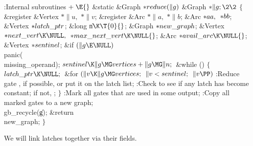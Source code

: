 \Y\B\4:Internal subroutines\X${}\mathrel+\E{}$\6
\1\1\&{static} \&{Graph} ${}{*}\\{reduce}(\|g){}$\6
\&{Graph} ${}{*}\|g;\2\2{}$\6
${}\{{}$\5
\1\&{register} \&{Vertex} ${}{*}\|u,{}$ ${}{*}\|v{}$;\6
\&{register} \&{Arc} ${}{*}\|a,{}$ ${}{*}\|b{}$;\6
\&{Arc} ${}{*}\\{aa},{}$ ${}{*}\\{bb}{}$;\6
\&{Vertex} ${}{*}\\{latch\_ptr}{}$;\6
\&{long} \|n${}\K\T{0}{}$;\6
\&{Graph} ${}{*}\\{new\_graph}{}$;\6
\&{Vertex} ${}{*}\\{next\_vert}\K\NULL,{}$ ${}{*}\\{max\_next\_vert}\K\NULL{}$;%
\6
\&{Arc} ${}{*}\\{avail\_arc}\K\NULL{}$;\6
\&{Vertex} ${}{*}\\{sentinel}{}$;\7
\&{if} ${}(\|g\E\NULL){}$\1\5
\\{panic}(\\{missing\_operand});\2\6
${}\\{sentinel}\K\|g\MG\\{vertices}+\|g\MG\|n;{}$\6
\&{while} ()\5
${}\{{}$\1\6
${}\\{latch\_ptr}\K\NULL;{}$\6
\&{for} ${}(\|v\K\|g\MG\\{vertices};{}$ ${}\|v<\\{sentinel};{}$ ${}\|v\PP){}$\1%
\5
:Reduce gate , if possible, or put it on the latch list\X;\2\6
:Check to see if any latch has become constant; if not, \X;\6
\4${}\}{}$\2\6
:Mark all gates that are used in some output\X;\6
:Copy all marked gates to a new graph\X;\6
\\{gb\_recycle}(\|g);\6
\&{return} \\{new\_graph};\6
\4${}\}{}$\2\par
\fi

We will link latches together via their  fields.

